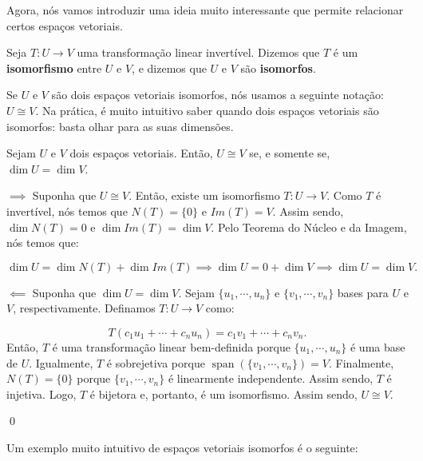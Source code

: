 Agora, nós vamos introduzir uma ideia muito interessante que permite relacionar certos espaços vetoriais.

\begin{Definition}[Isomorfismo]
	Seja $T:U\to V$ uma transformação linear invertível. Dizemos que $T$ é um \textbf{isomorfismo} entre $U$ e $V$, e dizemos que $U$ e $V$ são \textbf{isomorfos}.
\end{Definition}

Se $U$ e $V$ são dois espaços vetoriais isomorfos, nós usamos a seguinte notação: $U\cong V$. Na prática, é muito intuitivo saber quando dois espaços vetoriais são isomorfos: basta olhar para as suas dimensões.

\begin{Theorem}
	Sejam $U$ e $V$ dois espaços vetoriais. Então, $U\cong V$ se, e somente se, $\dim U = \dim V$.
\end{Theorem}

\begin{Proof}
	$\implies$ Suponha que $U\cong V$. Então, existe um isomorfismo $T:U\to V$. Como $T$ é invertível, nós temos que $N(T) = \{0\}$ e $Im(T) = V$. Assim sendo, $\dim N(T) = 0$ e $\dim Im(T) = \dim V$. Pelo Teorema do Núcleo e da Imagem, nós temos que:
	
	$$
	\dim U = \dim N(T) + \dim Im(T)\implies \dim U = 0 + \dim V \implies \dim U = \dim V.
	$$
	
	$\impliedby$ Suponha que $\dim U = \dim V$. Sejam $\{u_1, \cdots, u_n\}$ e $\{v_1, \cdots, v_n\}$ bases para $U$ e $V$, respectivamente. Definamos $T:U\to V$ como:
	
	$$
	T(c_1u_1 + \cdots + c_nu_n) = c_1v_1 + \cdots + c_nv_n.
	$$
	Então, $T$ é uma transformação linear bem-definida porque $\{u_1, \cdots, u_n\}$ é uma base de $U$. Igualmente, $T$ é sobrejetiva porque $\operatorname{span}(\{v_1, \cdots, v_n\}) = V$. Finalmente, $N(T) = \{0\}$ porque $\{v_1, \cdots, v_n\}$ é linearmente independente. Assim sendo, $T$ é injetiva. Logo, $T$ é bijetora e, portanto, é um isomorfismo. Assim sendo, $U\cong V$.
	
	\qed
\end{Proof}

Um exemplo muito intuitivo de espaços vetoriais isomorfos é o seguinte:

